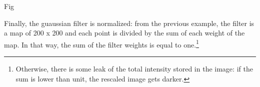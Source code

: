 \documentclass[12pt]{report}
\begin{document}
Fig

Finally, the guaussian filter is normalized: from the previous example, the filter is a map of 200 x 200 and each point is divided by the sum of each weight of the map. In that way, the sum of the filter weights is equal to one.\footnote{Otherwise, there is some leak of the total intensity stored in the image: if the sum is lower than unit, the rescaled image gets darker.}
\end{document}
